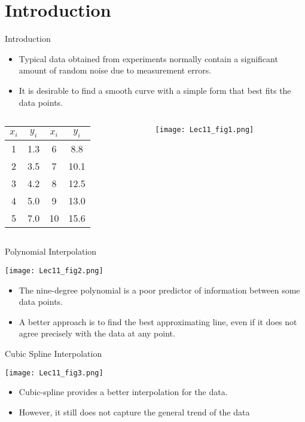 \documentclass{beamer}
\begin{document}
\section[Introduction]{Introduction}
\begin{frame}{Introduction}
\begin{itemize}
\item Typical data obtained from experiments normally contain a significant amount of random noise due to measurement errors. 
\item It is desirable to find a smooth curve with a simple form that \alert{best} fits the data points. 
\end{itemize}
\begin{columns}
\begin{column}[b]{0.3\textwidth}
\begin{center}
\begin{tabular}{cc|cc}
\hline
$x_i$ & $y_i$ & $x_i$ & $y_i$
\\\hline
1 & 1.3 & 6 & 8.8\\
2 & 3.5 & 7 & 10.1 \\
3 & 4.2 & 8 & 12.5\\
4 & 5.0 & 9 & 13.0 \\
5 & 7.0 & 10 & 15.6\\
\hline
\end{tabular}
\end{center}
\end{column}
\begin{column}{0.6\textwidth}
\centerline{\texttt{[image: Lec11\_fig1.png]}}
\end{column}
\end{columns}
\end{frame}
\begin{frame}{Polynomial Interpolation}
\centerline{\texttt{[image: Lec11\_fig2.png]}}

\begin{itemize}
\item The nine-degree polynomial is a \alert{poor} predictor of information between some data points. 
\item A better approach is to find the \alert{best approximating line}, even if it does not agree precisely with the data at \alert{any point}.
\end{itemize}
\end{frame}
\begin{frame}{Cubic Spline Interpolation}
\centerline{\texttt{[image: Lec11\_fig3.png]}}

\begin{itemize}
\item Cubic-spline provides a better interpolation for the data.
\item However, it still does not capture the general trend of the data
\end{itemize}
\end{frame}
\end{document}
